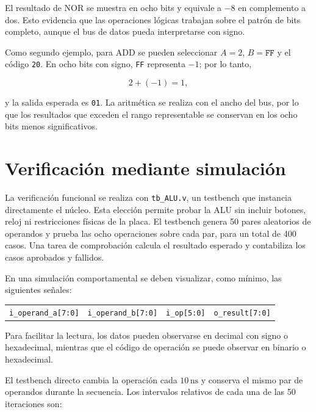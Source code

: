 \documentclass[11pt,a4paper]{article}
\newcommand{\verilog}[1]{\texttt{#1}}
\begin{document}
El resultado de NOR se muestra en ocho bits y equivale a $-8$ en complemento
a dos. Esto evidencia que las operaciones lógicas trabajan sobre el patrón de
bits completo, aunque el bus de datos pueda interpretarse con signo.

Como segundo ejemplo, para ADD se pueden seleccionar $A=2$, $B=\texttt{FF}$ y
el código \texttt{20}. En ocho bits con signo, \texttt{FF} representa $-1$;
por lo tanto,

\begin{equation}
  2 + (-1) = 1,
\end{equation}

y la salida esperada es \texttt{01}. La aritmética se realiza con el ancho del
bus, por lo que los resultados que exceden el rango representable se conservan
en los ocho bits menos significativos.

\section{Verificación mediante simulación}

La verificación funcional se realiza con \verilog{tb\_ALU.v}, un testbench que
instancia directamente el núcleo. Esta elección permite probar la ALU sin
incluir botones, reloj ni restricciones físicas de la placa. El testbench genera
50 pares aleatorios de operandos y prueba las ocho operaciones sobre cada par,
para un total de 400 casos. Una tarea de comprobación calcula el resultado
esperado y contabiliza los casos aprobados y fallidos.

En una simulación comportamental se deben visualizar, como mínimo, las
siguientes señales:

\begin{center}
\begin{tabular}{c c c c}
\texttt{i\_operand\_a[7:0]} &
\texttt{i\_operand\_b[7:0]} &
\texttt{i\_op[5:0]} &
\texttt{o\_result[7:0]}
\end{tabular}
\end{center}

Para facilitar la lectura, los datos pueden observarse
en decimal con signo o hexadecimal, mientras que el código de operación se
puede observar en binario o hexadecimal.

El testbench directo cambia la operación cada $10\,\mathrm{ns}$ y conserva el
mismo par de operandos durante la secuencia. Los intervalos relativos de cada
una de las 50 iteraciones son:
\end{document}
